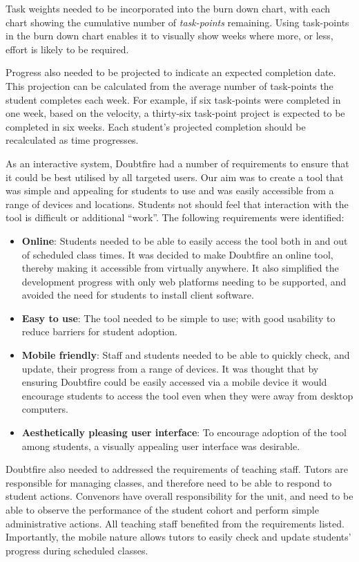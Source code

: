 Task weights needed to be incorporated into the burn down chart, with each chart showing the cumulative number of \emph{task-points} remaining. Using task-points in the burn down chart enables it to visually show weeks where more, or less, effort is likely to be required.

Progress also needed to be projected to indicate an expected completion date. This projection can be calculated from the average number of task-points the student completes each week.  For example, if six task-points were completed in one week, based on the velocity, a thirty-six task-point project is expected to be completed in six weeks. Each student's projected completion should be recalculated as time progresses. 

As an interactive system, Doubtfire had a number of requirements to ensure that it could be best utilised by all targeted users. Our aim was to create a tool that was simple and appealing for students to use and was easily accessible from a range of devices and locations. Students not should feel that interaction with the tool is difficult or additional ``work''. The following requirements were identified:

\begin{itemize}[noitemsep,nolistsep]
  \item \textbf{Online}: Students needed to be able to easily access the tool both in and out of scheduled class times. It was decided to make Doubtfire an online tool, thereby making it accessible from virtually anywhere. It also simplified the development progress with only web platforms needing to be supported, and avoided the need for students to install client software.
  \item \textbf{Easy to use}: The tool needed to be simple to use; with good usability to reduce barriers for student adoption.
  \item \textbf{Mobile friendly}: Staff and students needed to be able to quickly check, and update, their progress from a range of devices. It was thought that by ensuring Doubtfire could be easily accessed via a mobile device it would encourage students to access the tool even when they were away from desktop computers. 
  \item \textbf{Aesthetically pleasing user interface}: To encourage adoption of the tool among students, a visually appealing user interface was desirable.
\end{itemize}


Doubtfire also needed to addressed the requirements of teaching staff. Tutors are responsible for managing classes, and therefore need to be able to respond to student actions. Convenors have overall responsibility for the unit, and need to be able to observe the performance of the student cohort and perform simple administrative actions. All teaching staff benefited from the requirements listed. Importantly, the mobile nature allows tutors to easily check and update students' progress during scheduled classes.

